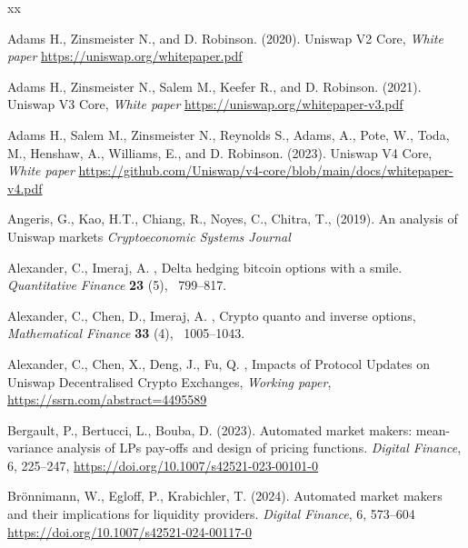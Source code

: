 \documentclass[pdftex,11pt,a4paper] {article}
\begin{document}
\begin{thebibliography}{xx}

 Adams H., Zinsmeister N.,
and D. Robinson. (2020). Uniswap V2 Core, \emph{White paper} %
\url{https://uniswap.org/whitepaper.pdf}

 Adams H., Zinsmeister N.,
Salem M., Keefer R., and D. Robinson. (2021). Uniswap V3 Core, \emph{White
paper} \url{https://uniswap.org/whitepaper-v3.pdf}


 Adams H., Salem M., Zinsmeister N., Reynolds S., Adams, A., Pote, W., Toda, M., Henshaw, A., Williams, E., and D. Robinson. (2023). Uniswap V4 Core, \emph{White
paper} \url{https://github.com/Uniswap/v4-core/blob/main/docs/whitepaper-v4.pdf}


Angeris, G., Kao, H.T., Chiang, R., Noyes, C., Chitra, T., (2019). An
analysis of Uniswap markets \emph{Cryptoeconomic Systems Journal}


Alexander, C., Imeraj, A. \harvardyearright ,
Delta hedging bitcoin options with a smile. \emph{Quantitative Finance} \textbf{23}%
(5), ~799--817.


Alexander, C., Chen, D., Imeraj, A. \harvardyearright ,
Crypto quanto and inverse options, \emph{Mathematical Finance} \textbf{33}%
(4), ~1005--1043.


Alexander, C., Chen, X., Deng, J., Fu, Q. \harvardyearright ,
Impacts of Protocol Updates on Uniswap Decentralised Crypto Exchanges, \emph{Working paper}, \url{https://ssrn.com/abstract=4495589}




 Bergault, P.,
Bertucci, L., Bouba, D. (2023). Automated market makers: mean-variance
analysis of LPs pay-offs and design of pricing functions. \emph{Digital
Finance}, 6, 225--247, \url{https://doi.org/10.1007/s42521-023-00101-0}


 Br\"onnimann, W., Egloff, P., Krabichler, T. (2024). Automated market makers and their implications
for liquidity providers. \emph{Digital
Finance}, 6, 573--604 \url{https://doi.org/10.1007/s42521-024-00117-0}



\end{thebibliography}
\end{document}
